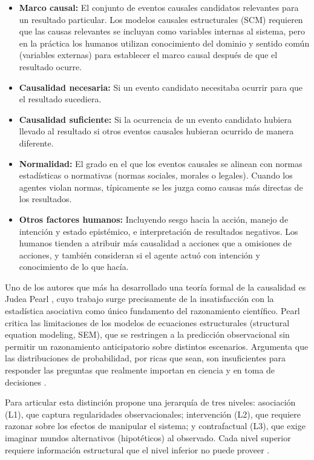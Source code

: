 \documentclass{article}
\begin{document}
\begin{itemize}
	\item \textbf{Marco causal:} El conjunto de eventos causales candidatos 
  relevantes para un resultado particular. Los modelos causales estructurales (SCM) 
  requieren que las causas relevantes se incluyan como variables internas al sistema, 
  pero en la práctica los humanos utilizan conocimiento del dominio  y sentido común (variables externas) para establecer el marco causal 
  después de que el resultado ocurre.
	\item \textbf{Causalidad necesaria:} Si un evento candidato necesitaba ocurrir para que el resultado sucediera.
	\item \textbf{Causalidad suficiente:} Si la ocurrencia de un evento candidato hubiera llevado al resultado si otros eventos causales hubieran ocurrido de manera diferente.
	\item \textbf{Normalidad:} El grado en el que los eventos causales se alinean con normas estadísticas o normativas (normas sociales, morales o legales). Cuando los agentes violan normas, típicamente se les juzga como causas más directas de los resultados.
	\item \textbf{Otros factores humanos:} Incluyendo sesgo hacia la acción, manejo de intención y estado epistémico, e interpretación de resultados negativos. Los humanos tienden a atribuir más causalidad a acciones que a omisiones de acciones, y también consideran si el agente actuó con intención y conocimiento de lo que hacía.
\end{itemize}

Uno de los autores que más ha desarrollado una teoría formal de la 
causalidad es Judea Pearl \parencite{pearl2009causality}, cuyo trabajo surge precisamente de la 
insatisfacción con la estadística asociativa como único fundamento del 
razonamiento científico. Pearl critica las limitaciones de los modelos 
de ecuaciones estructurales (structural equation modeling, SEM), que se restringen 
a la predicción observacional sin permitir un razonamiento anticipatorio sobre distintos escenarios.
 Argumenta que las distribuciones de probabilidad, por ricas que sean, 
son insuficientes para responder las preguntas que realmente importan en ciencia y en 
toma de decisiones \parencite{pearl2009causality, pearl2018bookOfWhy}. 

Para articular esta distinción propone una jerarquía 
de tres niveles: asociación (L1), que captura regularidades observacionales; 
intervención (L2), que requiere razonar sobre los efectos de manipular el 
sistema; y contrafactual (L3), que exige imaginar mundos alternativos (hipotéticos) al 
observado. Cada nivel superior requiere información estructural que el 
nivel inferior no puede proveer \parencite{pearl2018theoretical}. 
\end{document}
